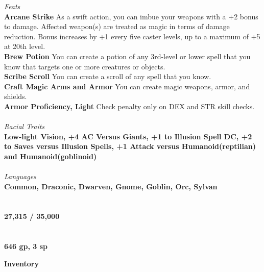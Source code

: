 \documentclass[letterpaper]{article}
\begin{document}
\noindent\emph{Feats} \\
\noindent\textbf{Arcane Strike} As a swift action, you can imbue your weapons with a +2 bonus to damage.  Affected weapon(s) are treated as magic in terms of damage reduction.  Bonus increases by +1 every five caster levels, up to a maximum of +5 at 20th level. \\
\noindent\textbf{Brew Potion} You can create a potion of any 3rd-level or lower spell that you know that targets one or more creatures or objects. \\
\noindent\textbf{Scribe Scroll} You can create a scroll of any spell that you know. \\
\noindent\textbf{Craft Magic Arms and Armor} You can create magic weapons, armor, and shields. \\
\noindent\textbf{Armor Proficiency, Light} Check penalty only on {\footnotesize DEX} and {\footnotesize STR} skill checks. \\
\\
\noindent\emph{Racial Traits} \\
\textbf{Low-light Vision, +4 AC Versus Giants, +1 to Illusion Spell DC, +2 to Saves versus Illusion Spells, +1 Attack versus Humanoid(reptilian) and Humanoid(goblinoid)} \\
\\
\noindent\emph{Languages} \\
\textbf{Common, Draconic, Dwarven, Gnome, Goblin, Orc, Sylvan} \\
\\
 \\
\textbf{27,315 / 35,000} \\
\\
 \\
\textbf{646 gp, 3 sp} \\

\pagebreak

\noindent \textbf{\huge{Inventory}} \\
\end{document}
